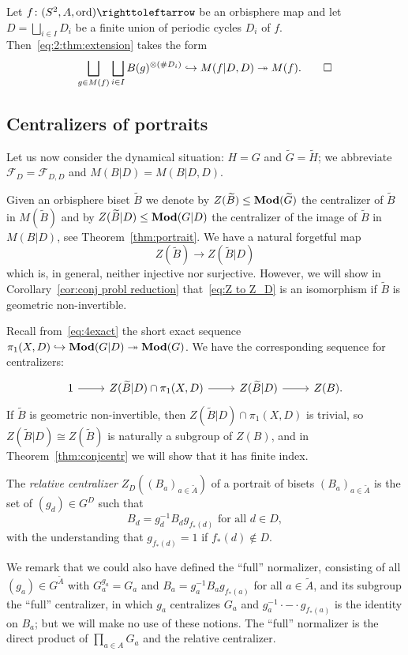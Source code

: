 \documentclass{amsart}
\newcommand\Forget{{\mathcal F}}
\newcommand\wtA{{\widetilde A}}
\newcommand\wtB{{\widetilde B}}
\newcommand\wtG{{\widetilde G}}
\newcommand\wtH{{\widetilde H}}
\begin{document}
\begin{cor}\label{cor:thm:extension}
  Let $f\colon(S^2,A,\ord)\selfmap $ be an orbisphere map and let
  $D=\bigsqcup_{i\in I} D_i$ be a finite union of periodic cycles
  $D_i$ of $f$. Then~\eqref{eq:2:thm:extension} takes the form
  \begin{equation}\label{eq:cor:thm:extension}
    \bigsqcup_{g\in M(f)}\bigsqcup_{i\in I} B(g)^{\otimes(\#D_i)}\hookrightarrow  M(f|D,D) \twoheadrightarrow M(f).\qed
  \end{equation}
\end{cor}

\subsection{Centralizers of portraits}\label{ss:diff centr}
Let us now consider the dynamical situation: $H=G$ and $\wtG=\wtH$; we
abbreviate $\Forget_{D}=\Forget_{D,D}$ and $M(B|D)=M(B|D,D)$.

Given an orbisphere biset $\wtB$ we denote by
$Z(\wtB)\le\Mod(\wtG)$ the centralizer of
$\wtB$ in $M(\wtB)$ and by
$Z(\wtB|D)\le\Mod(G|D)$ the centralizer of the image of
$\wtB$ in $M(B|D)$, see Theorem~\ref{thm:portrait}. We have a
natural forgetful map
\begin{equation}\label{eq:Z to Z_D}
  Z(\wtB) \to Z(\wtB|D)
\end{equation}
which is, in general, neither injective nor surjective. However, we
will show in Corollary~\ref{cor:conj probl reduction} that~\eqref{eq:Z
  to Z_D} is an isomorphism if $\wtB$ is geometric
non-invertible.

Recall from~\eqref{eq:4exact} the short exact sequence
$\pi_1(X,D)\hookrightarrow \mathbf{\relax Mod}(G|D) \twoheadrightarrow \mathbf{\relax Mod}(G)$. We
have the corresponding sequence for centralizers:
\begin{equation}
  \begin{tikzcd}
    1\ar[r] & Z(\wtB|D) \cap \pi_1(X,D) \ar[r] & Z(\wtB|D) \ar[r] & Z(B).
  \end{tikzcd}
\end{equation}
If $\wtB$ is geometric non-invertible, then
$Z(\wtB|D) \cap \pi_1(X,D)$ is trivial, so
$Z(\wtB|D)\cong Z(\wtB)$ is naturally a subgroup of
$ Z(B)$, and in Theorem~\ref{thm:conjcentr} we will show that it has
finite index.

\begin{defn}
  The \emph{relative centralizer} $Z_D((B_a)_{a\in \wtA})$ of
  a portrait of bisets $(B_a)_{a\in \wtA}$ is the set of
  $(g_d)\in G^D$ such that
  \[B_d = g_d^{-1} B_d g_{f_*(d)}\text{ for all }d\in D,
  \]
  with the understanding that $g_{f_*(d)}=1$ if $f_*(d)\not\in D$.
\end{defn}
We remark that we could also have defined the ``full'' normalizer,
consisting of all $(g_a)\in G^{\wtA}$ with $G_a^{g_a}=G_a$ and
$B_a=g_a^{-1}B_a g_{f_*(a)}$ for all $a\in\wtA$, and its
subgroup the ``full'' centralizer, in which $g_a$ centralizes $G_a$
and $g_a^{-1}\cdot{-}\cdot g_{f_*(a)}$ is the identity on $B_a$; but
we will make no use of these notions. The ``full'' normalizer is the direct
product of $\prod_{a\in A}G_a$ and the relative centralizer.
\end{document}
